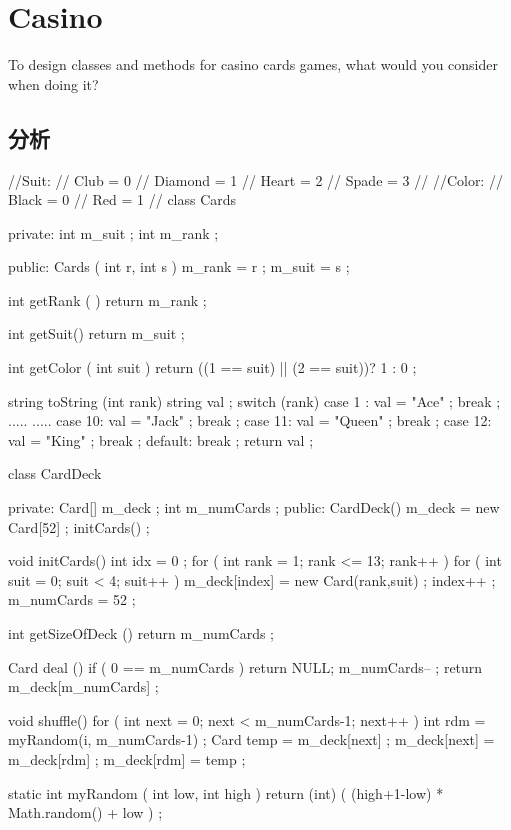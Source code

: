 \section{Casino}
To design classes and methods for casino cards games, what would you consider when doing it?

\subsection{分析}
\begin{Code}
	//Suit: 
	//	Club = 0 
	//	Diamond = 1 
	//	Heart = 2 
	//	Spade = 3 
	//
	//Color: 
	//	Black = 0 
	//	Red = 1
	//	
	class Cards {
		private:
		int m_suit ;
		int m_rank ;
		
		public:
		Cards ( int r, int s ) {
			m_rank = r ;
			m_suit = s ;
		}
		
		int getRank ( ) { 
			return m_rank ;
		}
		
		int getSuit() {
			return m_suit ;
		}
		
		int getColor ( int suit ) {
			return ((1 == suit) || (2 == suit))? 1 : 0 ;
		}
		
		string toString (int rank) {
			string val ;
			switch (rank) {
				case 1 :
				val = "Ace" ;
				break ;
				.....
				.....
				case 10:
				val = "Jack" ;
				break ;
				case 11:
				val = "Queen" ;
				break ;
				case 12:
				val = "King" ;
				break ;
				default:
				break ;
			}
			return val ;
		}
	}
	
	class CardDeck{
		private:
		Card[] m_deck ;
		int m_numCards ;
		public:
		CardDeck() {
			m_deck = new Card[52] ;
			initCards() ;
		}
		
		void initCards() {
			int idx = 0 ;
			for ( int rank = 1; rank <= 13; rank++ ) {
				for ( int suit = 0; suit < 4; suit++ ) {
					m_deck[index] = new Card(rank,suit) ;
					index++ ;
				}
			}
			m_numCards = 52 ;
		}
		
		int getSizeOfDeck () {
			return m_numCards ;
		}
		
		Card deal () {
			if ( 0 == m_numCards )
			return NULL;
			m_numCards-- ;
			return m_deck[m_numCards] ;
		}
		
		void shuffle() {
			for ( int next = 0; next < m_numCards-1; next++ ) {
				int rdm = myRandom(i, m_numCards-1) ;
				Card temp = m_deck[next] ;
				m_deck[next] = m_deck[rdm] ;
				m_deck[rdm] = temp ;
			}
		}
		
		static int myRandom ( int low, int high ) {
			return (int) ( (high+1-low) * Math.random() + low ) ;
		}
	}
\end{Code}

